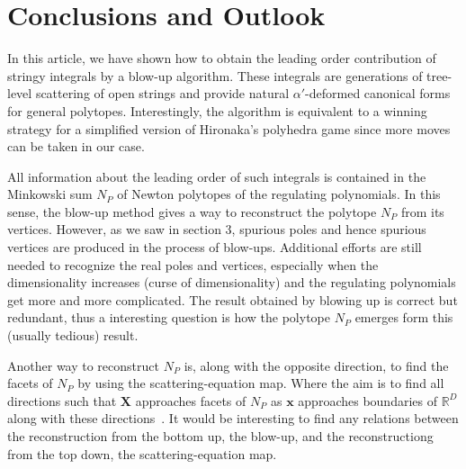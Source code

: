 \documentclass[12pt]{article}
\theoremstyle{definition}
\newtheorem{defi}[para]{Definition}
\theoremstyle{plain}
\begin{document}
% 
% 



\section{Conclusions and Outlook}


In this article, we have shown how to obtain the leading order contribution of stringy integrals by a blow-up algorithm. These integrals are generations of tree-level scattering of open strings and provide natural $\alpha'$-deformed canonical forms for general polytopes.  Interestingly, the algorithm is equivalent to a winning strategy for a simplified version of Hironaka's polyhedra game since more moves can be taken in our case.

All information about the leading order of such integrals is contained in the Minkowski sum $N_{P}$ of Newton polytopes of the regulating polynomials. In this sense, the blow-up method gives a way to reconstruct the polytope $N_{P}$ from its vertices. However, as we saw in section 3, spurious poles and hence spurious vertices are produced in the process of blow-ups. Additional efforts are still needed to recognize the real poles and vertices, especially when the dimensionality increases (curse of dimensionality) and the regulating polynomials get more and more complicated. The result obtained by blowing up is correct but redundant, thus a interesting question is how the polytope $N_{P}$ emerges form this (usually tedious) result. 


Another way to reconstruct $N_{P}$ is, along with the opposite direction, to find the facets of $N_{P}$ by using the scattering-equation map. Where the aim is to find all directions such that $\mathbf{X}$ approaches facets of $N_{P}$ as $\mathbf{x}$ approaches boundaries of $\mathbb{R}^{D}$ along with these directions~\cite{}. It would be interesting to find any relations between the reconstruction from the bottom up, the blow-up, and the reconstructiong from the top down, the scattering-equation map.
\end{document}
